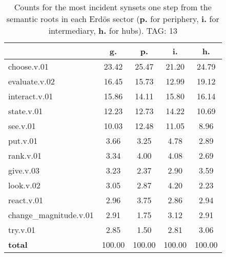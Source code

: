 \begin{table}[h!]
\begin{center}
\begin{tabular}{| l || c | c | c | c |}\hline
 & {\bf g.} & {\bf p.} & {\bf i.} & {\bf h.} \\\hline\hline
choose.v.01 & 23.42  & 25.47  & 21.20  & 24.79 \\\hline
evaluate.v.02 & 16.45  & 15.73  & 12.99  & 19.12 \\\hline
interact.v.01 & 15.86  & 14.11  & 15.80  & 16.14 \\\hline
state.v.01 & 12.23  & 12.73  & 14.22  & 10.69 \\\hline
see.v.01 & 10.03  & 12.48  & 11.05  & 8.96 \\\hline
put.v.01 & 3.66  & 3.25  & 4.78  & 2.89 \\\hline
rank.v.01 & 3.34  & 4.00  & 4.08  & 2.69 \\\hline
give.v.03 & 3.23  & 2.37  & 2.90  & 3.59 \\\hline
look.v.02 & 3.05  & 2.87  & 4.20  & 2.23 \\\hline
react.v.01 & 2.96  & 3.75  & 2.86  & 2.94 \\\hline
change\_magnitude.v.01 & 2.91  & 1.75  & 3.12  & 2.91 \\\hline
try.v.01 & 2.85  & 1.50  & 2.81  & 3.06 \\\hline\hline
{{\bf total}} & 100.00  & 100.00  & 100.00  & 100.00 \\\hline
\end{tabular}
\caption{Counts for the most incident synsets one step from the semantic roots in each Erd\"os sector ({\bf p.} for periphery, {\bf i.} for intermediary, {\bf h.} for hubs). TAG: 13}
\end{center}
\end{table}
